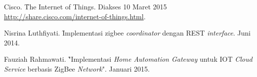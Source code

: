 %
% 

% 
% 
\begin{thebibliography}{10}

{Cisco. \f{The Internet of Things}.
Diakses 10 Maret 2015 \url{http://share.cisco.com/internet-of-things.html}.}

{Nisrina Luthfiyati. \f{Implementasi zigbee \textit{coordinator} dengan REST \textit{interface}}.
Juni 2014.}

{Fauziah Rahmawati. \f{"Implementasi \textit{Home Automation Gateway} untuk IOT \textit{Cloud Service} berbasis ZigBee \textit{Network}"}.
Januari 2015.}


\end{thebibliography}

